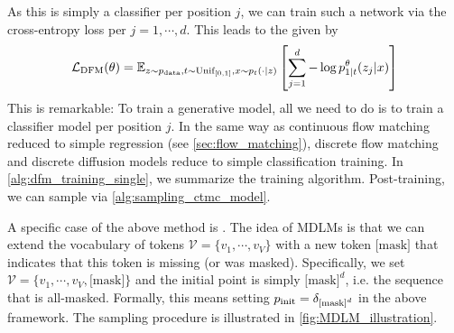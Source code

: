 As this is simply a classifier per position $j$, we can train such a network via the cross-entropy loss per $j=1,\cdots,d$. This leads to the  given by
\begin{align*}
\mathcal{L}_{\text{DFM}}(\theta)=\mathbb{E}_{z\sim p_{\rm{data}}, t\sim\text{Unif}_{[0,1]}, x\sim p_t(\cdot|z)}\left[\sum\limits_{j=1}^{d}-\log p_{1|t}^\theta(z_j|x)\right]
\end{align*}
This is remarkable: To train a generative model, all we need to do is to train a classifier model per position $j$. In the same way as continuous flow matching reduced to simple regression (see \cref{sec:flow_matching}), discrete flow matching and discrete diffusion models reduce  to simple classification training. In \cref{alg:dfm_training_single}, we summarize the training algorithm. Post-training, we can sample via \cref{alg:sampling_ctmc_model}.
\begin{examplebox}
A specific case of the above method is . The idea of MDLMs is that we can extend the vocabulary of tokens $\mathcal{V}=\{v_1,\cdots,v_{V}\}$ with a new token $\text{[mask]}$ that indicates that this token is missing (or was masked). Specifically, we set $\mathcal{V}=\{v_1,\cdots,v_{V},\text{[mask]}\}$ and the initial point is simply $\text{[mask]}^d$, i.e. the sequence that is all-masked. Formally, this means setting $p_{\rm{init}}=\delta_{\text{[mask]}^d}$ in the above framework. The sampling procedure is illustrated in \cref{fig:MDLM_illustration}.
\end{examplebox}

